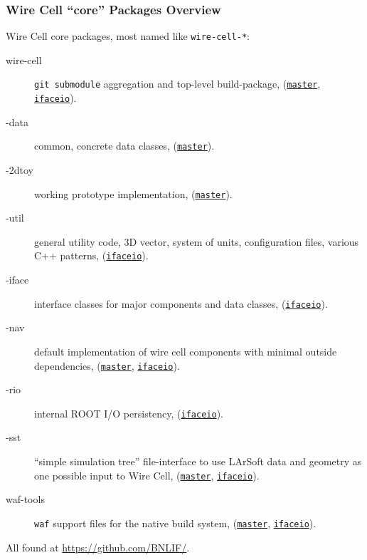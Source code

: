 \documentclass[xcolor=dvipsnames]{beamer}
\begin{document}
\begin{frame}
  \frametitle{Wire Cell ``core'' Packages Overview}

  \footnotesize

  Wire Cell core packages, most named like \texttt{wire-cell-*}:

  \begin{description}
  \item[wire-cell] \texttt{git submodule} aggregation and top-level build-package,
    (\href{https://github.com/BNLIF/wire-cell/}{\texttt{master}},
    \href{https://github.com/BNLIF/wire-cell/tree/ifaceio/}{\texttt{ifaceio}}).
  \item[-data] common, concrete data
    classes, (\href{https://github.com/BNLIF/wire-cell-data/}{\texttt{master}}).
  \item[-2dtoy] working prototype implementation,
    (\href{https://github.com/BNLIF/wire-cell-2dtoy}{\texttt{master}}).
  \item[-util] general utility code, 3D vector, system of units,
    configuration files, various C++ patterns,
    (\href{https://github.com/BNLIF/wire-cell-util/tree/ifaceio}{\texttt{ifaceio}}).
  \item[-iface] interface classes for major components and data
    classes, 
    (\href{https://github.com/BNLIF/wire-cell-iface/tree/ifaceio}{\texttt{ifaceio}}).
  \item[-nav] default implementation of wire cell components with
    minimal outside dependencies, (\href{https://github.com/BNLIF/wire-cell-nav/}{\texttt{master}},
    \href{https://github.com/BNLIF/wire-cell-nav/tree/ifaceio/}{\texttt{ifaceio}}).
  \item[-rio] internal ROOT I/O persistency,
    (\href{https://github.com/BNLIF/wire-cell-rio/tree/ifaceio/}{\texttt{ifaceio}}).
  \item[-sst] ``simple simulation tree'' file-interface to use LArSoft
    data and geometry as one possible input to Wire Cell,
    (\href{https://github.com/BNLIF/wire-cell-sst/}{\texttt{master}},
    \href{https://github.com/BNLIF/wire-cell-sst/tree/ifaceio/}{\texttt{ifaceio}}).
  \item[waf-tools] \texttt{waf} support files for the native build
    system,
    (\href{https://github.com/BNLIF/waf-tools/}{\texttt{master}},
    \href{https://github.com/BNLIF/waf-tools/tree/ifaceio/}{\texttt{ifaceio}}).

  \end{description}
  All found at \url{https://github.com/BNLIF/}.
  
\end{frame}
\end{document}
